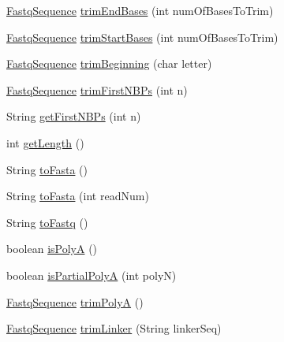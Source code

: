 \begin{DoxyCompactItemize}
\item 
\hyperlink{classbroad_1_1pda_1_1seq_1_1fastq_1_1_fastq_sequence}{Fastq\+Sequence} \hyperlink{classbroad_1_1pda_1_1seq_1_1fastq_1_1_fastq_sequence_ace80714d5df0dcf2ae24abdde90b3baa}{trim\+End\+Bases} (int num\+Of\+Bases\+To\+Trim)
\item 
\hyperlink{classbroad_1_1pda_1_1seq_1_1fastq_1_1_fastq_sequence}{Fastq\+Sequence} \hyperlink{classbroad_1_1pda_1_1seq_1_1fastq_1_1_fastq_sequence_a9eca00d202f96c264893e7ac26cca58a}{trim\+Start\+Bases} (int num\+Of\+Bases\+To\+Trim)
\item 
\hyperlink{classbroad_1_1pda_1_1seq_1_1fastq_1_1_fastq_sequence}{Fastq\+Sequence} \hyperlink{classbroad_1_1pda_1_1seq_1_1fastq_1_1_fastq_sequence_a23828799871d655ea393485e61c0703d}{trim\+Beginning} (char letter)
\item 
\hyperlink{classbroad_1_1pda_1_1seq_1_1fastq_1_1_fastq_sequence}{Fastq\+Sequence} \hyperlink{classbroad_1_1pda_1_1seq_1_1fastq_1_1_fastq_sequence_aa6d0e245f31727b72796442117dd59bc}{trim\+First\+N\+B\+Ps} (int n)
\item 
String \hyperlink{classbroad_1_1pda_1_1seq_1_1fastq_1_1_fastq_sequence_ac112cfd094a9ce4d543a3a4bf96946bc}{get\+First\+N\+B\+Ps} (int n)
\item 
int \hyperlink{classbroad_1_1pda_1_1seq_1_1fastq_1_1_fastq_sequence_a6fd087d51a9fd2ab4083360cd019a9e9}{get\+Length} ()
\item 
String \hyperlink{classbroad_1_1pda_1_1seq_1_1fastq_1_1_fastq_sequence_ab6298d31c12bc1eea3adc16c5ea1e79f}{to\+Fasta} ()
\item 
String \hyperlink{classbroad_1_1pda_1_1seq_1_1fastq_1_1_fastq_sequence_a155961c3353f53a635a5e4d077606b9c}{to\+Fasta} (int read\+Num)
\item 
String \hyperlink{classbroad_1_1pda_1_1seq_1_1fastq_1_1_fastq_sequence_aa3696805cd9e75cff61a93093635f11c}{to\+Fastq} ()
\item 
boolean \hyperlink{classbroad_1_1pda_1_1seq_1_1fastq_1_1_fastq_sequence_ae96731dcb1c3e8c7c03cc592bfb05101}{is\+Poly\+A} ()
\item 
boolean \hyperlink{classbroad_1_1pda_1_1seq_1_1fastq_1_1_fastq_sequence_ad97e971df9d823122223a236ead320d0}{is\+Partial\+Poly\+A} (int poly\+N)
\item 
\hyperlink{classbroad_1_1pda_1_1seq_1_1fastq_1_1_fastq_sequence}{Fastq\+Sequence} \hyperlink{classbroad_1_1pda_1_1seq_1_1fastq_1_1_fastq_sequence_a2bfacdf03f541d7bafb094ca8d4c0b51}{trim\+Poly\+A} ()
\item 
\hyperlink{classbroad_1_1pda_1_1seq_1_1fastq_1_1_fastq_sequence}{Fastq\+Sequence} \hyperlink{classbroad_1_1pda_1_1seq_1_1fastq_1_1_fastq_sequence_a64623b219d38679aa95cd6d2a673cc84}{trim\+Linker} (String linker\+Seq)
\end{DoxyCompactItemize}


